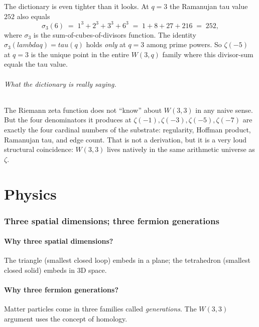 \documentclass[11pt]{article}
\def\lambda{lambda}%
\def\tau{tau}%
\begin{document}
The dictionary is even tighter than it looks. At $q=3$ the
Ramanujan tau value $252$ also equals
\[
\sigma_3(6) \;=\; 1^3 + 2^3 + 3^3 + 6^3 \;=\; 1 + 8 + 27 + 216 \;=\; 252,
\]
where $\sigma_3$ is the sum-of-cubes-of-divisors function. The identity
$\sigma_3(\lambda q) = \tau(q)$ holds \emph{only} at $q = 3$ among prime
powers. So $\zeta(-5)$ at $q=3$ is the unique point in the entire
$W(3,q)$ family where this divisor-sum equals the tau value.

\paragraph{What the dictionary is really saying.}
The Riemann zeta function does not ``know'' about $W(3,3)$ in any naive
sense. But the four denominators it produces at $\zeta(-1), \zeta(-3),
\zeta(-5), \zeta(-7)$ are exactly the four cardinal numbers of the
substrate: regularity, Hoffman product, Ramanujan tau, and edge count.
That is not a derivation, but it is a very loud structural coincidence:
$W(3,3)$ lives natively in the same arithmetic universe as $\zeta$.

\part{Physics}

\section{Three spatial dimensions; three fermion generations}

\subsection*{Why three spatial dimensions?}

The triangle (smallest closed loop) embeds in a plane; the tetrahedron (smallest closed solid) embeds in $3$D space.

\subsection*{Why three fermion generations?}

Matter particles come in three families called \emph{generations}. The $W(3,3)$ argument uses the concept of homology.
\end{document}
